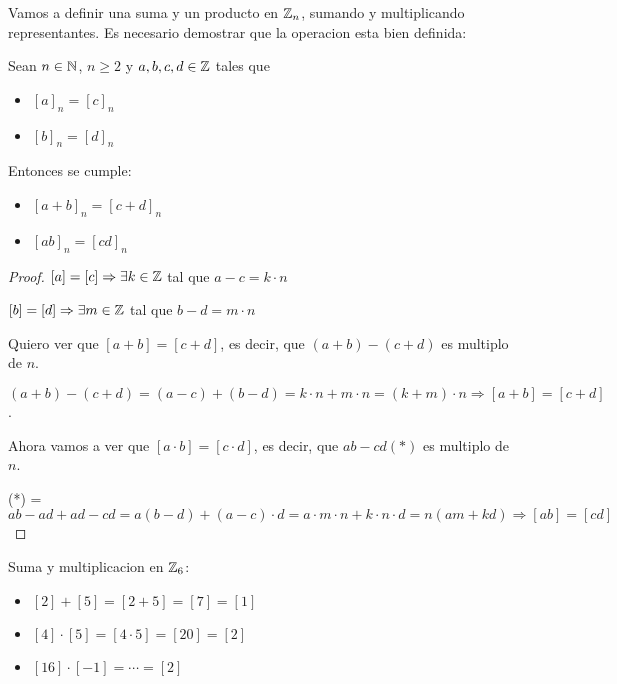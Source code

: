 Vamos a definir una suma y un producto en \(\mathbb{Z}_n \), sumando y multiplicando representantes. Es necesario demostrar que la operacion esta bien definida:
\begin{proposition}
	Sean \(n \in \mathbb{N} \), \(n \geq  2 \) y \(a,b,c,d \in \mathbb{Z} \) tales que
	\begin{itemize}
		\item \([a]_n = [c]_n \)
		\item \([b]_n = [d]_n \)
		      
	\end{itemize}
	Entonces se cumple:
	\begin{itemize}
		\item \([a+b]_n = [c+d]_n \)
		\item \([ab]_n = [cd]_n \)
	\end{itemize}
\end{proposition}
\begin{proof}
	\([a] = [c] \Rightarrow \exists k \in \mathbb{Z} \) tal que \(a - c = k \cdot n \)
	
	\([b] = [d] \Rightarrow \exists m \in \mathbb{Z} \) tal que \(b - d = m \cdot n \)
	
	Quiero ver que \([a+b ] = [c + d ]\), es decir, que \((a + b) - (c + d) \) es multiplo de \(n \).
	
	\((a+b) - (c + d) = (a - c) + (b - d) = k \cdot n + m \cdot n = (k + m) \cdot n \Rightarrow [a + b] = [c + d ]\).
	
	Ahora vamos a ver que \([a \cdot b] = [c \cdot d ]\), es decir, que \(ab - cd (*)\) es multiplo de \(n \).
	
	(*) =  \(ab - ad + ad - cd = a(b - d) + (a - c) \cdot d = a \cdot m \cdot n + k \cdot n \cdot d = n (am + kd) \Rightarrow [ab] = [cd]\)
\end{proof}
\begin{example}
	Suma y multiplicacion en \(\mathbb{Z}_6\):
	\begin{itemize}
		\item \([2] + [5] = [2 + 5] = [7] = [1]\)
		\item \([4] \cdot [5] = [4 \cdot 5] = [20] = [2 ]\)
		\item \([16] \cdot [-1] = \cdots = [2 ]\)
	\end{itemize}
\end{example}

